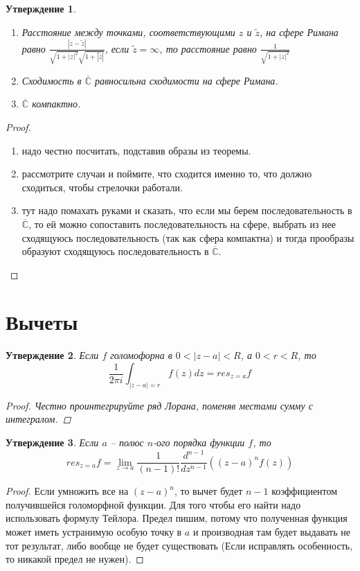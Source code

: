 \documentclass[12pt, letterpaper]{article}
\newtheorem{prop}{Утверждение}[section]
\begin{document}
\begin{prop}
\begin{enumerate}
\item Расстояние между точками, соответствующими $z$ и $\widetilde{z}$, на сфере Римана равно $\frac{|z-\widetilde{z}|}{\sqrt{1+|z|^2}\sqrt{1+|\widetilde{z}|}}$, если $\widetilde{z} = \infty$, то расстояние равно $\frac{1}{\sqrt{1+|z|^2}}$
\item Сходимость в $\overline{\mathbb{C}}$ равносильна сходимости на сфере Римана.
\item $\overline{\mathbb{C}}$ компактно. 
\end{enumerate}
\end{prop}

\begin{proof}
\begin{enumerate}
\item надо честно посчитать, подставив образы из теоремы.
\item рассмотрите случаи и поймите, что сходится именно то, что должно сходиться, чтобы стрелочки работали.
\item тут надо помахать руками и сказать, что если мы берем последовательность в $\overline{\mathbb{C}}$, то ей можно сопоставить последовательность на сфере, выбрать из нее сходящуюсь последовательность (так как сфера компактна) и тогда прообразы образуют сходящуюсь последовательность в $\overline{\mathbb{C}}$. 
\end{enumerate}
\end{proof}

\section{Вычеты}

\begin{prop} 
Если $f$ голомофорна в $0<|z-a|<R$, а $0<r<R$, то $$\frac{1}{2\pi i} \int_{|z-a|=r} f(z)dz = res_{z=a} f$$
\begin{proof}
Честно проинтегрируйте ряд Лорана, поменяв местами сумму с интегралом.
\end{proof}
\end{prop}

\begin{prop}
Если $a$ -- полюс $n$-ого порядка функции $f$, то $$res_{z=a} f = \lim_{z\rightarrow a} \frac{1}{(n-1)!} \frac{d^{n-1}}{dz^{n-1}} ((z-a)^n f(z)) $$
\end{prop}
\begin{proof}
Если умножить все на $(z-a)^n$, то вычет будет $n-1$ коэффициентом получившейся голоморфной функции. Для того чтобы его найти надо использовать формулу Тейлора. Предел пишим, потому что полученная функция может иметь устранимую особую точку в $a$ и производная там будет выдавать не тот результат, либо вообще не будет существовать (Если исправлять особенность, то никакой предел не нужен). 
\end{proof}
\end{document}
